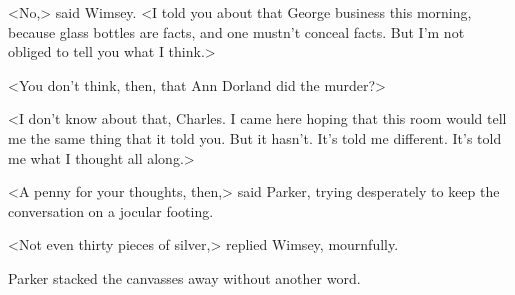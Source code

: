 <No,> said Wimsey. <I told you about that George business this morning, because glass bottles are facts, and one mustn't conceal facts. But I'm not obliged to tell you what I think.>

<You don't think, then, that Ann Dorland did the murder?>

<I don't know about that, Charles. I came here hoping that this room would tell me the same thing that it told you. But it hasn't. It's told me different. It's told me what I thought all along.>

<A penny for your thoughts, then,> said Parker, trying desperately to keep the conversation on a jocular footing.

<Not even thirty pieces of silver,> replied Wimsey, mournfully.

Parker stacked the canvasses away without another word.